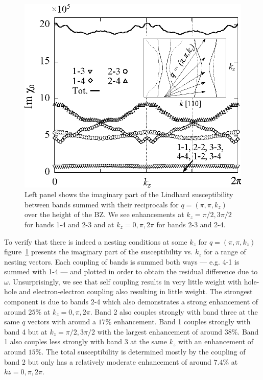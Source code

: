 \begin{figure}[htbp]
    \begin{center}
        \includegraphics[scale=0.7]{Chapter-dHvABaFe2P2/Figures/Susceptibility/NestingVector/NestingVector}
        \caption{Left panel shows the imaginary part of the Lindhard susceptibility between bands summed with their reciprocals for $q=(\pi, \pi, k_z)$ over the height of the \ac{BZ}. We see enhancements at $k_z=\pi/2,3\pi/2$ for bands 1-4 and 2-3 and at $k_z=0,\pi,2\pi$ for bands 2-3 and 2-4.}
        \label{Fig:ResD:NestingVector}
    \end{center}
\end{figure}
To verify that there is indeed a nesting conditions at some $k_z$ for $q=(\pi, \pi, k_z)$ figure~\ref{Fig:ResD:NestingVector} presents the imaginary part of the susceptibility vs. $k_z$ for a range of nesting vectors. Each coupling of bands is summed both ways --- e.g. 4-1 is summed with 1-4 --- and plotted in order to obtain the residual difference due to $\omega$. Unsurprisingly, we see that self coupling results in very little weight with hole-hole and electron-electron coupling also resulting in little weight. The strongest component is due to bands 2-4 which also demonstrates a strong enhancement of around $25\%$ at $k_z=0,\pi,2\pi$. Band 2 also couples strongly with band three at the same $q$ vectors with around a $17\%$ enhancement. Band 1 couples strongly with band 4 but at $k_z=\pi/2,3\pi/2$ with the largest enhancement of around $38\%$. Band 1 also couples less strongly with band $3$ at the same $k_z$ with an enhancement of around $15\%$. The total susceptibility is determined mostly by the coupling of band 2 but only has a relatively moderate enhancement of around $7.4\%$ at $kz=0,\pi,2\pi$.

